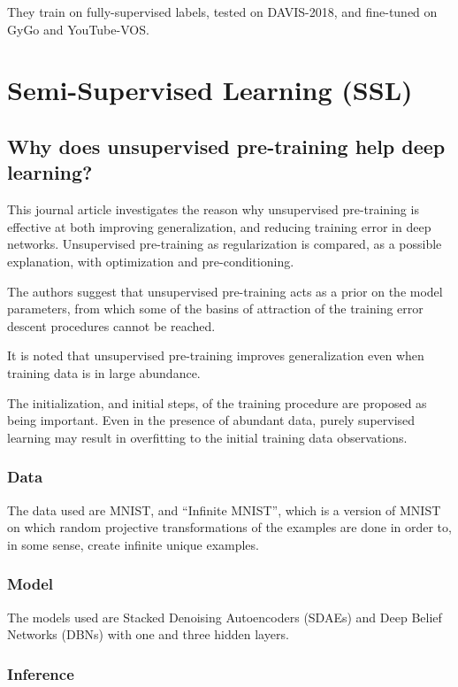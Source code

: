 \documentclass[a4paper, 12pt]{article}
\begin{document}
They train on fully-supervised labels, tested on DAVIS-2018, and fine-tuned on
GyGo and YouTube-VOS\@.


\section{Semi-Supervised Learning (SSL)}

\subsection{Why does unsupervised pre-training help deep
            learning?~\citet{Erhan:2010:WUP:1756006.1756025}}

This journal article investigates the reason why unsupervised pre-training is
effective at both improving generalization, and reducing training error in deep
networks. Unsupervised pre-training as regularization is compared, as a possible
explanation, with optimization and pre-conditioning.

The authors suggest that unsupervised pre-training acts as a prior on the model
parameters, from which some of the basins of attraction of the training error
descent procedures cannot be reached.

It is noted that unsupervised pre-training improves generalization even when
training data is in large abundance.

The initialization, and initial steps, of the training procedure are proposed
as being important. Even in the presence of abundant data, purely supervised
learning may result in overfitting to the initial training data observations.


\subsubsection{Data}

The data used are MNIST, and ``Infinite MNIST'', which is a version of MNIST on
which random projective transformations of the examples are done in order to,
in some sense, create infinite unique examples.


\subsubsection{Model}

The models used are Stacked Denoising Autoencoders (SDAEs) and Deep Belief
Networks (DBNs) with one and three hidden layers.


\subsubsection{Inference}
\end{document}
